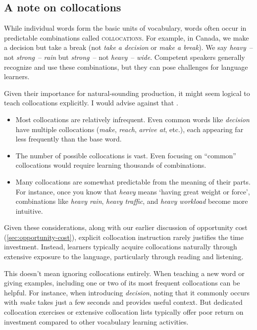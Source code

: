 \subsection{A note on collocations}\label{sec:collocations}

While individual words form the basic units of vocabulary, words often occur in predictable combinations called \textsc{collocations}. For example, in Canada, we make a decision but take a break (not \textit{take a decision} or \textit{make a break}). We say \textit{heavy}~-- not \textit{strong}~-- \textit{rain} but \textit{strong}~-- not \textit{heavy}~-- \textit{wide}. Competent speakers generally recognize and use these combinations, but they can pose challenges for language learners.

Given their importance for natural-sounding production, it might seem logical to teach collocations explicitly. I would advise against that \citep{reynolds2019against}.

\begin{itemize}
    \item Most collocations are relatively infrequent. Even common words like \textit{decision} have multiple collocations (\textit{make}, \textit{reach}, \textit{arrive at}, etc.), each appearing far less frequently than the base word.
    
    \item The number of possible collocations is vast. Even focusing on ``common'' collocations would require learning thousands of combinations.
    
    \item Many collocations are somewhat predictable from the meaning of their parts. For instance, once you know that \textit{heavy} means `having great weight or force', combinations like \textit{heavy rain}, \textit{heavy traffic}, and \textit{heavy workload} become more intuitive.
\end{itemize}

Given these considerations, along with our earlier discussion of opportunity cost (\ref{sec:opportunity-cost}), explicit collocation instruction rarely justifies the time investment. Instead, learners typically acquire collocations naturally through extensive exposure to the language, particularly through reading and listening.

This doesn't mean ignoring collocations entirely. When teaching a new word or giving examples, including one or two of its most frequent collocations can be helpful. For instance, when introducing \textit{decision}, noting that it commonly occurs with \textit{make} takes just a few seconds and provides useful context. But dedicated collocation exercises or extensive collocation lists typically offer poor return on investment compared to other vocabulary learning activities.

